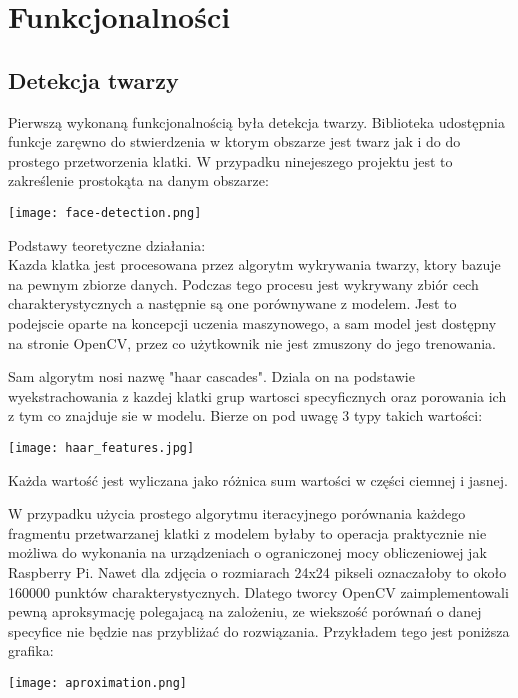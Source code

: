 \documentclass{article}
\begin{document}
\section{Funkcjonalności}
\subsection{Detekcja twarzy}
Pierwszą wykonaną funkcjonalnością była detekcja twarzy. Biblioteka udostępnia funkcje zaręwno do stwierdzenia w ktorym obszarze jest twarz jak i do do prostego przetworzenia klatki. W przypadku ninejeszego projektu jest to zakreślenie prostokąta na danym obszarze:

\begin{center}
    \texttt{[image: face-detection.png]}
\end{center}

Podstawy teoretyczne działania: \\
Kazda klatka jest procesowana przez algorytm wykrywania twarzy, ktory bazuje na pewnym zbiorze danych. Podczas tego procesu jest wykrywany zbiór cech charakterystycznych a następnie są one porównywane z modelem. Jest to podejscie oparte na koncepcji uczenia maszynowego, a sam model jest dostępny na stronie OpenCV, przez co użytkownik nie jest zmuszony do jego trenowania.

Sam algorytm nosi nazwę "haar cascades". Dziala on na podstawie wyekstrachowania z kazdej klatki grup wartosci specyficznych oraz porowania ich z tym co znajduje sie w modelu. Bierze on pod uwagę 3 typy takich wartości:

\begin{center}
    \texttt{[image: haar\_features.jpg]}
\end{center}

Każda wartość jest wyliczana jako różnica sum wartości w części ciemnej i jasnej.

W przypadku użycia prostego algorytmu iteracyjnego porównania każdego fragmentu przetwarzanej klatki z modelem byłaby to operacja praktycznie nie możliwa do wykonania na urządzeniach o ograniczonej mocy obliczeniowej jak Raspberry Pi. Nawet dla zdjęcia o rozmiarach 24x24 pikseli oznaczałoby to około 160000 punktów charakterystycznych. Dlatego tworcy OpenCV zaimplementowali pewną aproksymację polegajacą na zalożeniu, ze wiekszość porównań o danej specyfice nie będzie nas przybliżać do rozwiązania. Przykładem tego jest poniższa grafika:

\begin{center}
    \texttt{[image: aproximation.png]}
\end{center}
\end{document}
